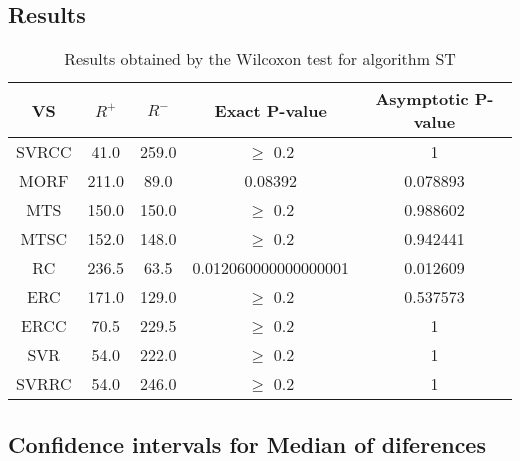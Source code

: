 \documentclass[a4paper,10pt]{article}
\begin{document}
\subsection{Results}

\begin{table}[!htp]
\centering\small
\begin{tabular}{
|c|c|c|c|c|}
\hline
 VS & $R^{+}$ & $R^{-}$ & Exact P-value & Asymptotic P-value \\ \hline 
SVRCC & 41.0 & 259.0 & $\geq$ 0.2 & 1\\ \hline 
MORF & 211.0 & 89.0 & 0.08392 & 0.078893\\ \hline 
MTS & 150.0 & 150.0 & $\geq$ 0.2 & 0.988602\\ \hline 
MTSC & 152.0 & 148.0 & $\geq$ 0.2 & 0.942441\\ \hline 
RC & 236.5 & 63.5 & 0.012060000000000001 & 0.012609\\ \hline 
ERC & 171.0 & 129.0 & $\geq$ 0.2 & 0.537573\\ \hline 
ERCC & 70.5 & 229.5 & $\geq$ 0.2 & 1\\ \hline 
SVR & 54.0 & 222.0 & $\geq$ 0.2 & 1\\ \hline 
SVRRC & 54.0 & 246.0 & $\geq$ 0.2 & 1\\ \hline 

\end{tabular}
\caption{Results obtained by the Wilcoxon test for algorithm ST}
\end{table}

\subsection{Confidence intervals for Median of diferences}
\end{document}
